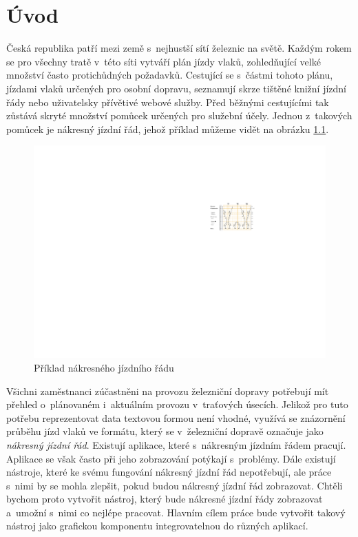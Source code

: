 \chapter{Úvod}
\label{kap:uvod}
Česká republika patří mezi země s~nejhustší sítí železnic na světě. Každým rokem se pro všechny tratě v~této síti vytváří plán jízdy vlaků, zohledňující velké množství často protichůdných požadavků. Cestující se s~částmi tohoto plánu, jízdami vlaků určených pro osobní dopravu, seznamují skrze tištěné knižní jízdní řády nebo uživatelsky přívětivé webové služby. Před běžnými cestujícími tak zůstává skryté množství pomůcek určených pro služební účely. Jednou z~takových pomůcek je nákresný jízdní řád, jehož příklad můžeme vidět na obrázku \ref{fig:uvod:njr_bez_anotaci}.

\begin{figure}[ht]
	\centering
	\includegraphics[width=\textwidth]{../img/kap1_uvod_grafikon}
	\caption{Příklad nákresného jízdního řádu}
	\label{fig:uvod:njr_bez_anotaci}
\end{figure}

Všichni zaměstnanci zúčastněni na provozu železniční dopravy potřebují mít přehled o~plánovaném i~aktuálním provozu v~traťových úsecích. Jelikož pro tuto potřebu reprezentovat data textovou formou není vhodné, využívá se znázornění průběhu jízd vlaků ve formátu, který se v~železniční dopravě označuje jako \textit{nákresný jízdní řád}. 
Existují aplikace, které s~nákresným jízdním řádem pracují. Aplikace se však často při jeho zobrazování potýkají s~problémy. Dále existují nástroje, které ke svému fungování nákresný jízdní řád nepotřebují, ale práce s~nimi by se mohla zlepšit, pokud budou nákresný jízdní řád zobrazovat. Chtěli bychom proto vytvořit nástroj, který bude nákresné jízdní řády zobrazovat a~umožní s~nimi co nejlépe pracovat. Hlavním cílem práce bude vytvořit takový nástroj jako grafickou komponentu integrovatelnou do různých aplikací.

